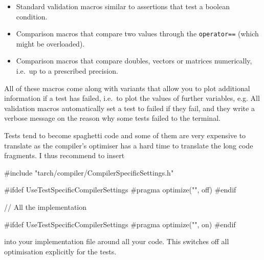 \begin{itemize}
  \item Standard validation macros similar to assertions that test a boolean
  condition.
  \item Comparison macros that compare two values through the
  \texttt{operator==} (which might be overloaded).
  \item Comparison macros that compare doubles, vectors or matrices numerically,
  i.e.~up to a prescribed precision.
\end{itemize}

\noindent
All of these macros come along with variants that allow you to plot additional
information if a test has failed, i.e.~to plot the values of further variables,
e.g.
All validation macros automatically set a test to failed if they fail, and they
write a verbose message on the reason why some tests failed to the terminal.  



  Tests tend to become spaghetti code and some of them are very expensive to
  translate as the compiler's optimiser has a hard time to translate the long
  code fragments.
  I thus recommend to insert
  \begin{code}
#include "tarch/compiler/CompilerSpecificSettings.h"

#ifdef UseTestSpecificCompilerSettings
#pragma optimize("", off)
#endif

// All the implementation

#ifdef UseTestSpecificCompilerSettings
#pragma optimize("", on)
#endif
  \end{code}
  into your implementation file around all your code. This switches off all
  optimisation explicitly for the tests.


